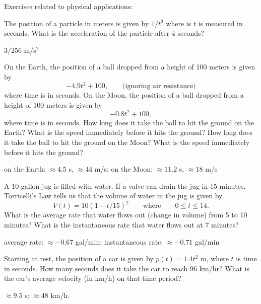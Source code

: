 



\begin{exercises}

\noindent Exercises related to physical applications:


\begin{exercise}
The position of a particle in meters is given by $1/t^3$ where is $t$
is measured in seconds. What is the acceleration of the particle after
$4$ seconds?
\begin{answer}
$3/256$ m/s$^2$
\end{answer}
\end{exercise}

\begin{exercise}
On the Earth, the position of a ball dropped from a height of 100
meters is given by
\[
-4.9t^2+100,\qquad\text{(ignoring air resistance)}
\]
where time is in seconds.  On the Moon, the position of a ball dropped
from a height of 100 meters is given by
\[
-0.8t^2+100,
\]
where time is in seconds.  How long does it take the ball to hit the
ground on the Earth? What is the speed immediately before it hits the
ground? How long does it take the ball to hit the ground on the Moon?
What is the speed immediately before it hits the ground?
\begin{answer}
on the Earth: $\approx 4.5$ s, $\approx 44$ m/s; on the Moon: $\approx
11.2$ s, $\approx 18$ m/s
\end{answer}
\end{exercise}

\begin{exercise}
A $10$ gallon jug is filled with water. If a valve can drain the jug
in 15 minutes, Torricelli's Law tells us that the volume of water in the jug is given by
\[
V(t) = 10\left(1-t/15\right)^2 \qquad\text{where}\qquad 0\le t\le 14. 
\]
What is the average rate that water flows out (change in volume) from
5 to 10 minutes? What is the instantaneous rate that water flows out at
7 minutes?
\begin{answer}
average rate: $\approx -0.67$ gal/min; instantaneous rate: $\approx-0.71$
gal/min
\end{answer}
\end{exercise}

\begin{exercise}
Starting at rest, the position of a car is given by $p(t) = 1.4t^2$ m,
where $t$ is time in seconds.  How many seconds does it take the car to reach
$96$ km/hr? What is the car's average velocity (in km/h) on that time period?
\begin{answer}
$\approx 9.5$ s; $\approx 48$ km/h.
\end{answer}
\end{exercise}


\end{exercises}
